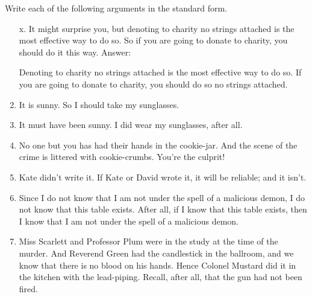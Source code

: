 \problempart
Write each of the following arguments in the standard form.
\begin{enumerate}
	\item[x.] It might surprise you, but denoting to charity no strings attached is the most effective way to do so. So if you are going to donate to charity, you should do it this way.
	\prem Answer:
	\begin{earg}
	\prem	Denoting to charity no strings attached is the most effective way to do so.
	\conc	If you are going to donate to charity, you should do so no strings attached.
	\end{earg}
	
	\item It is sunny. So I should take my sunglasses.
	\item It must have been sunny. I did wear my sunglasses, after all.
	\item No one but you has had their hands in the cookie-jar. And the scene of the crime is littered with cookie-crumbs. You're the culprit! 
	\item Kate didn't write it. If Kate or David wrote it, it will be reliable; and it isn’t.
	\item  Since I do not know that I am not under the spell of a malicious demon, I do not know that this table exists. After all, if I know that this table exists, then I know that I am not under the spell of a malicious demon. 
	\item Miss Scarlett and Professor Plum were in the study at the time of the murder. And Reverend Green had the candlestick in the ballroom, and we know that there is no blood on his hands. Hence Colonel Mustard did it in the kitchen with the lead-piping. Recall, after all, that the gun had not been fired.

\end{enumerate}
